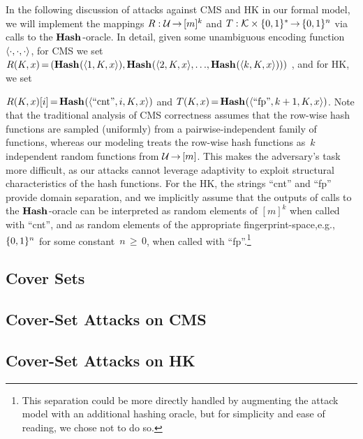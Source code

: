 In the following discussion of attacks against CMS and HK in our formal model, we will implement the mappings $R:\mathcal{U}\,{\to}\, [m]^k$ and $T: \mathcal{K}\times\{0,1\}^*\,{\to}\,\{0,1\}^n$ via calls to the $\textup{\textbf{Hash}}\hspace{0.5pt}$-oracle.  
In detail, given some unambiguous encoding function $\langle \cdot,\cdot,\cdot \rangle$, for CMS we set $R(K,x)\,{=}\,(\textup{\textbf{Hash}}\hspace{0.5pt}(\langle 1,K,x \rangle),\textup{\textbf{Hash}}\hspace{0.5pt}(\langle 2,K,x \rangle,{\ldots},\allowbreak \textup{\textbf{Hash}}\hspace{0.5pt}(\langle k,K,x \rangle))) \allowbreak$ , and for HK, we set

$R(K,x)[i]\,{=}\,\textup{\textbf{Hash}}\hspace{0.5pt}(\langle ``\mathrm{cnt}",i,K,x \rangle)$
and $T(K,x) \allowbreak\,{=}\,\textup{\textbf{Hash}}\hspace{0.5pt}(\langle \mathrm{``fp"}, \allowbreak k+1,K,x \rangle)$.
Note that the traditional analysis of CMS correctness assumes that the row-wise hash functions are sampled (uniformly) from a pairwise-independent family of functions, whereas 
our modeling treats the row-wise hash functions as~$k$ independent random functions from $\mathcal{U}\,{\to}\, [m]$.  This makes the adversary's
task more difficult, as our attacks cannot leverage adaptivity to exploit structural characteristics of the hash functions.  
For the HK, the strings ``cnt'' and ``fp'' provide domain separation,
and we implicitly assume that the outputs of calls to the $\textup{\textbf{Hash}}\hspace{0.5pt}$-oracle can be interpreted as random elements of $[m]^k$ when called with ``cnt'', and as
random elements of the appropriate fingerprint-space,e.g., $\{0,1\}^n$ for some constant~$n\,{\geq}\, 0$, when called with ``fp''.\footnote{This separation could be more directly handled by augmenting the attack model with an additional hashing oracle, but for simplicity and ease of reading, we chose not to do so.} 

\subsection{Cover Sets}\label{sec:cov-set}


\subsection{Cover-Set Attacks on CMS}\label{sec:cms-attacks}


\subsection{Cover-Set Attacks on HK}\label{sec:hk-attacks}

